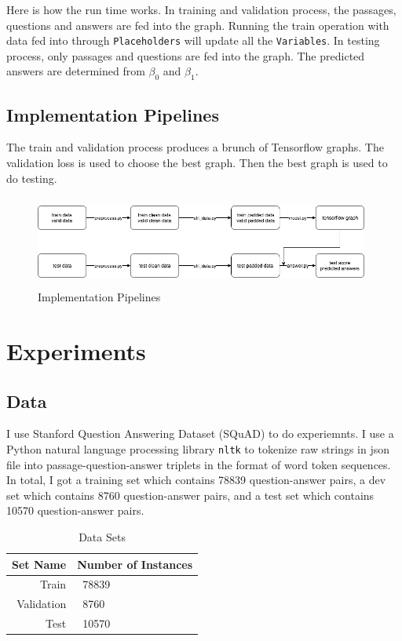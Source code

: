\documentclass[modernstyle,12pt]{sjsuthesis}
\theoremstyle{definition}
\begin{document}
Here is how the run time works. In training and validation process, the passages, questions and answers are fed into the graph. Running the train operation with data fed into through {\tt Placeholders} will update all the {\tt Variables}. In testing process, only passages and questions are fed into the graph. The predicted answers are determined from $\beta _0$ and $\beta _1$.






\section{Implementation Pipelines}

The train and validation process produces a brunch of Tensorflow graphs. The validation loss is used to choose the best graph. Then the best graph is used to do testing.

\begin{figure}[htbp]\centering
  \includegraphics[width=11cm, height=3cm]{figures/pipeline.png}
  \caption{Implementation Pipelines}
  \label{f:pipeline}
\end{figure}


\chapter{Experiments}
\section{Data}
I use Stanford Question Answering Dataset (SQuAD) to do experiemnts. I use a Python natural language processing library {\tt nltk} to tokenize raw strings in json file into passage-question-answer triplets in the format of word token sequences. In total, I got a training set which contains 78839 question-answer pairs, a dev set which contains 8760 question-answer pairs, and a test set which contains 10570 question-answer pairs.

\begin{table}[htbp]\centering
  \caption{Data Sets}
  \label{tab:dataset}
  \begin{tabular}{|r|l|} \hline
    Set Name & Number of Instances \\ \hline\hline
    Train & \ 78839 \\
    Validation & \ 8760 \\
    Test & \ 10570 \\ \hline
  \end{tabular}
\end{table}
\end{document}

